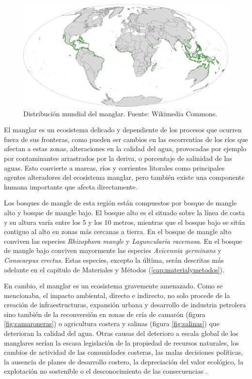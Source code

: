 \begin{figure}
	\centering
	\includegraphics[width=0.8\linewidth]{./Imagenes/distribucion_mundial_mangle.eps}
	\caption[Distribución mundial de manglar]{Distribución mundial del manglar. Fuente: Wikimedia Commons.}
	\label{fig:mundial}
\end{figure}

El manglar es un ecosistema delicado y dependiente de los procesos que ocurren fuera de sus fronteras, como pueden ser cambios en las escorrentías de los ríos que afectan a estas zonas, alteraciones en la calidad del agua, provocadas por ejemplo por contaminantes arrastrados por la deriva, o porcentaje de salinidad de las aguas. Esto convierte a mareas, ríos y corrientes litorales como principales agentes alteradores del ecosistema manglar, pero también existe una componente humana importante que afecta directamente.%

Los bosques de mangle de esta región están compuestos por bosque de mangle alto y bosque de mangle bajo. El bosque alto es el situado sobre la línea de costa y su altura varía entre los 5 y los 10 metros, mientras que el bosque bajo se sitúa contiguo al alto en zonas más cercanas a tierra. En el bosque de mangle alto conviven las especies \textit{Rhizophora mangle} y \textit{Laguncularia racemosa}. En el bosque de mangle bajo conviven mayormente las especies \textit{Avicennia germinans} y \textit{Conocarpus erectus}. Estas especies, excepto la última, serán descritas más adelante en el capítulo de Materiales y Métodos (\ref{cap:materialymetodos}).%

En cambio, el manglar es un ecosistema gravemente amenazado. Como se mencionaba, el impacto ambiental, directo e indirecto, no solo procede de la creación de infraestructuras, expansión urbana y desarrollo de industria petrolera sino también de la reconversión en zonas de cría de camarón (figura \ref{fig:camaroneras}) o agricultura costera y salinas (figura \ref{fig:salinas}) que deterioran la calidad del agua. Otras causas del deterioro a escala global de los manglares serían la escasa legislación de la propiedad de recursos naturales, los cambios de actividad de las comunidades costeras, las malas decisiones políticas, la ausencia de planes de desarrollo costero, la depreciación del valor ecológico, la explotación no sostenible o el desconocimiento de las consecuencias \citep{yanez1994}.%

